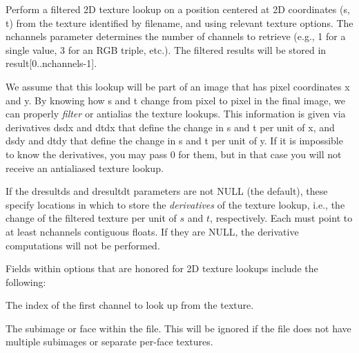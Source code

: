 
Perform a filtered 2D texture lookup on a position centered at 2D
coordinates ({\cf s}, {\cf t}) from the texture identified by
{\cf filename}, and using relevant texture {\cf options}.  The
{\cf nchannels} parameter determines the number of channels to retrieve
(e.g., 1 for a single value, 3 for an RGB triple, etc.).
The filtered results will be stored in {\cf result[0..nchannels-1]}.

We assume that this lookup will be part of an image that has pixel
coordinates {\cf x} and {\cf y}.  By knowing how {\cf s} and {\cf t}
change from pixel to pixel in the final image, we can properly
\emph{filter} or antialias the texture lookups.  This information is
given via derivatives {\cf dsdx} and {\cf dtdx} that define the change
in {\cf s} and {\cf t} per unit of {\cf x}, and {\cf dsdy} and {\cf
  dtdy} that define the change in {\cf s} and {\cf t} per unit of {\cf
  y}.  If it is impossible to know the derivatives, you may pass 0 for
them, but in that case you will not receive an antialiased texture lookup.

If the {\cf dresultds} and {\cf dresultdt} parameters are not {\cf NULL}
(the default), these specify locations in which to store the
\emph{derivatives} of the texture lookup, i.e., the change of the filtered
texture per unit of $s$ and $t$, respectively.  Each must point to at least
{\cf nchannels} contiguous floats.  If they are {\cf NULL}, the derivative
computations will not be performed.

Fields within {\cf options} that are honored for 2D texture lookups
include the following:

\vspace{-12pt}
\vspace{10pt}
The index of the first channel to look up from the texture.
\apiend

\vspace{-24pt}
\vspace{10pt}
The subimage or face within the file.
This will be ignored if the file does not have multiple subimages or
separate per-face textures.
\apiend

